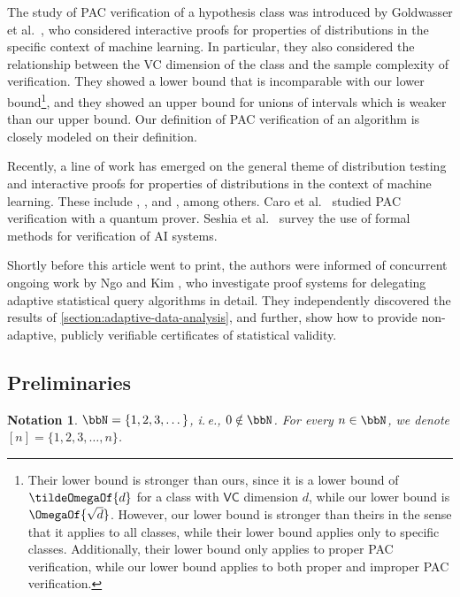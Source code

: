 \documentclass[11pt]{article}
\newtheorem{notation}[theorem]{Notation}
\newcommand{\ie}{i.\,e.}
\begin{document}
The study of PAC verification of a hypothesis class was introduced by Goldwasser et al.\ \cite{GoldwasserRSY21}, who considered interactive proofs for properties of distributions in the specific context of machine learning. In particular, they also considered the relationship between the VC dimension of the class and the sample complexity of verification. They showed a lower bound that is incomparable with our lower bound\footnote{%
	Their lower bound is stronger than ours, since it is a lower bound of $\tildeOmegaOf{d}$ for a class with $\mathsf{VC}$ dimension $d$, while our lower bound is $\OmegaOf{\sqrt{d}}$. However, our lower bound is stronger than theirs in the sense that it applies to all classes, while their lower bound applies only to specific classes. Additionally, their lower bound only applies to proper PAC verification, while our lower bound applies to both proper and improper PAC verification.%
}, and they showed an upper bound for unions of intervals which is weaker than our upper bound. Our definition of PAC verification of an algorithm is closely modeled on their definition.

Recently, %
a line of work has emerged  %
on the general theme of distribution testing and interactive proofs for properties of distributions in the context of machine learning. These include \cite{CanettiK21}, \cite{abs-2108-12099}, \cite{abs-2204-07196} and \cite{HermanR22}, among others. Caro et al.\ \cite{DBLP:journals/corr/abs-2306-04843} studied PAC verification with a quantum prover. Seshia et al.\ \cite{DBLP:journals/cacm/SeshiaSS22} survey the use of formal methods for verification of AI systems.

Shortly before this article went to print, the authors were informed of concurrent ongoing work by Ngo and Kim \cite{NgoKim}, who investigate proof systems for delegating adaptive statistical query algorithms in detail. They independently discovered the results of \cref{section:adaptive-data-analysis}, and further, show how to provide non-adaptive, publicly verifiable certificates of statistical validity.


\subsection{Preliminaries}\label{section:preliminaries}

\begin{notation}
	$\bbN = \{1,2,3,\dots\}$, \ie, $0 \notin \bbN$. For every $n \in \bbN$, we denote $[n] = \{1,2,3,\dots,n\}$.
\end{notation}
\end{document}
